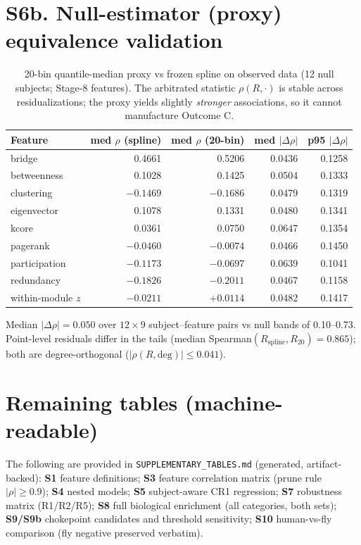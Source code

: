\documentclass[11pt,a4paper]{article}
\begin{document}
\section{S6b. Null-estimator (proxy) equivalence validation}
\begin{table}[h]\centering\small
\caption{20-bin quantile-median proxy vs frozen spline on observed data
(12 null subjects; Stage-8 features). The arbitrated statistic
$\rho(R,\cdot)$ is stable across residualizations; the proxy yields
slightly \emph{stronger} associations, so it cannot manufacture Outcome C.}
\begin{tabular}{lrrrr}
\toprule
Feature & med $\rho$ (spline) & med $\rho$ (20-bin) & med $|\Delta\rho|$ & p95 $|\Delta\rho|$ \\
\midrule
bridge & 0.4661 & 0.5206 & 0.0436 & 0.1258 \\
betweenness & 0.1028 & 0.1425 & 0.0504 & 0.1333 \\
clustering & $-0.1469$ & $-0.1686$ & 0.0479 & 0.1319 \\
eigenvector & 0.1078 & 0.1331 & 0.0480 & 0.1341 \\
kcore & 0.0361 & 0.0750 & 0.0647 & 0.1354 \\
pagerank & $-0.0460$ & $-0.0074$ & 0.0466 & 0.1450 \\
participation & $-0.1173$ & $-0.0697$ & 0.0639 & 0.1041 \\
redundancy & $-0.1826$ & $-0.2011$ & 0.0467 & 0.1158 \\
within-module $z$ & $-0.0211$ & $+0.0114$ & 0.0482 & 0.1417 \\
\bottomrule
\end{tabular}
\end{table}

\noindent
Median $|\Delta\rho| = 0.050$ over $12\times9$ subject--feature pairs vs
null bands of 0.10--0.73. Point-level residuals differ in the tails
(median Spearman$(R_{\mathrm{spline}}, R_{20}) = 0.865$); both are
degree-orthogonal ($|\rho(R,\mathrm{deg})|\le 0.041$).

\section{Remaining tables (machine-readable)}
The following are provided in \texttt{SUPPLEMENTARY\_TABLES.md} (generated,
artifact-backed): \textbf{S1} feature definitions; \textbf{S3} feature
correlation matrix (prune rule $|\rho|\ge0.9$); \textbf{S4} nested models;
\textbf{S5} subject-aware CR1 regression; \textbf{S7} robustness matrix
(R1/R2/R5); \textbf{S8} full biological enrichment (all categories, both
sets); \textbf{S9/S9b} chokepoint candidates and threshold sensitivity;
\textbf{S10} human-vs-fly comparison (fly negative preserved verbatim).
\end{document}
